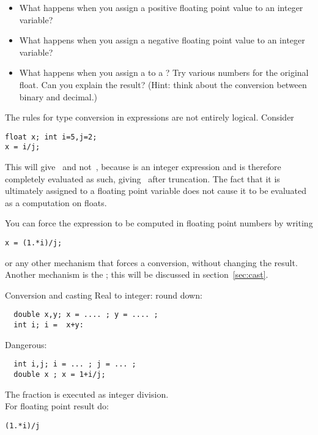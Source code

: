 \begin{exercise}
  \label{ex:float-convert}
  \begin{itemize}
  \item What happens when you assign a positive floating
    point value to an integer variable?
  \item What happens when you assign a negative floating
    point value to an integer variable?
  \item What happens when you assign a  to a ? 
    Try various numbers for the original float. Can you explain the
    result?
    (Hint: think about the conversion between binary and decimal.)
  \end{itemize}
\end{exercise}

The rules for type conversion in expressions are not entirely
logical. Consider
\begin{lstlisting}
float x; int i=5,j=2;
x = i/j;
\end{lstlisting}
This will give~ and not~, because  is an integer
expression and is therefore completely evaluated as such, giving~
after truncation. The fact
that it is ultimately assigned to a floating point variable does not
cause it to be evaluated as a computation on floats.

You can force the expression to be computed in floating point numbers
by writing
\begin{lstlisting}
x = (1.*i)/j;
\end{lstlisting}
or any other mechanism that forces a conversion, without changing the
result.  Another mechanism is the ; this will be
discussed in section~\ref{sec:cast}.

\begin{slide}{Conversion and casting}
  \label{sl:convert-cast}
  Real to integer: round down:
\begin{lstlisting}
  double x,y; x = .... ; y = .... ;
  int i; i =  x+y:
\end{lstlisting}
Dangerous:
\begin{lstlisting}
  int i,j; i = ... ; j = ... ; 
  double x ; x = 1+i/j;
\end{lstlisting}
The fraction is executed as integer division.\\
For floating point result do:
\begin{lstlisting}
(1.*i)/j
\end{lstlisting}
\end{slide}

